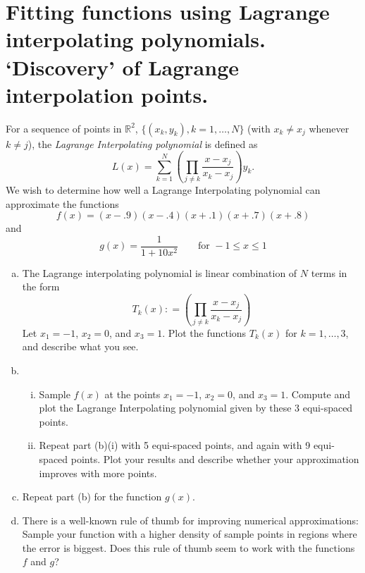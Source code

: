 \documentclass[11pt,oneside]{article}
\theoremstyle{definition}
\theoremstyle{definition}
\theoremstyle{remark}
\numberwithin{equation}{section}
\begin{document}
\section{Fitting functions using Lagrange interpolating polynomials.  `Discovery' of Lagrange interpolation points.}
For a sequence of points in $\mathbb{R}^2$, $\{(x_k,y_k) , k = 1, \dots, N\}$ (with $x_k \neq x_j$ whenever $k \neq j$), the \textit{Lagrange Interpolating polynomial} is defined as
\begin{equation}
L(x) = \sum_{k = 1}^N \left(\prod_{j \neq k}\frac{x-x_j}{x_k-x_j} \right) y_k.
\end{equation}
We wish to determine how well a Lagrange Interpolating polynomial can approximate the functions 
\begin{equation}
f(x) = (x-.9)(x-.4)(x+.1)(x+.7)(x+.8)
\end{equation}
and 
\begin{equation}
g(x) = \frac{1}{1+10x^2} \quad \quad \text{for } -1 \leq x \leq 1
\end{equation}
\begin{enumerate}[(a)]
    \item The Lagrange interpolating polynomial is linear combination of $N$ terms in the form
    \begin{equation}
    T_k(x): =\left( \prod_{j \neq k}\frac{x-x_j}{x_k-x_j}  \right) 
    \end{equation}
    Let $x_1= -1$, $x_2 = 0$, and $x_3 = 1$. Plot the functions $T_k(x)$ for $k = 1,\dots,3$, and describe what you see.
    \item 
    \begin{enumerate}[i.]
      \item Sample $f(x)$ at the points $x_1 = -1$, $x_2 = 0$, and $x_3= 1$. Compute and plot the Lagrange Interpolating polynomial given by these 3 equi-spaced points.
      \item Repeat part (b)(i) with 5 equi-spaced points, and again with 9 equi-spaced points. Plot your results and describe whether your approximation improves with more points. 
    \end{enumerate}
    \item Repeat part (b) for the function $g(x)$.
    \item There is a well-known rule of thumb for improving numerical approximations: Sample your function with a higher density of sample points in regions where the error is biggest. Does this rule of thumb seem to work with the functions $f$ and $g$?
\end{enumerate}
\end{document}
